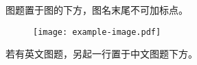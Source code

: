 \documentclass[degree=doctor, fontset=fandol]{ustcthesis}
\begin{document}
\START
\showoutput

\frontmatter

\listoffigures

\mainmatter

图题置于图的下方，图名末尾不可加标点。

\begin{figure}[h]
  \centering
  \texttt{[image: example-image.pdf]}
  \label{fig:example}
\end{figure}

若有英文图题，另起一行置于中文图题下方。

\clearpage
\OMIT
\end{document}
